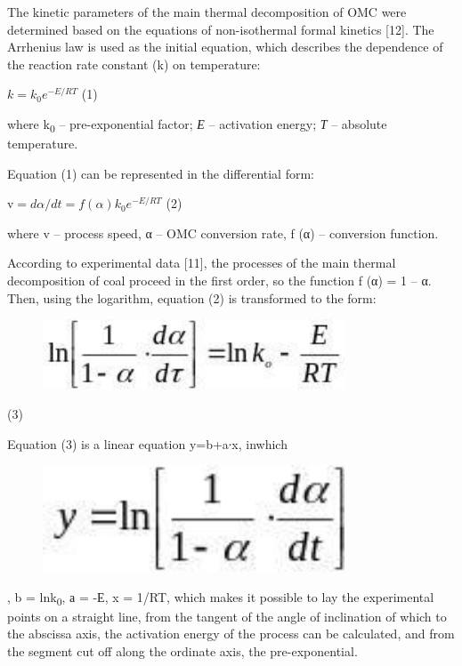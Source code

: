 The kinetic parameters of the main thermal decomposition of OMC were
determined based on the equations of non-isothermal formal kinetics
{[}12{]}. The Arrhenius law is used as the initial equation, which
describes the dependence of the reaction rate constant (k) on
temperature:

\(k = k_{0}e^{- E/RT}\) (1)

where k\textsubscript{0} -- pre-exponential factor; \emph{Е} --
activation energy; \emph{Т} -- absolute temperature.

Equation (1) can be represented in the differential form:

v\(= d\alpha/dt = f(\alpha)k_{0}e^{- E/RT}\) (2)

where v -- process speed, α -- OMC conversion rate, f (α) -- conversion
function.

According to experimental data {[}11{]}, the processes of the main
thermal decomposition of coal proceed in the first order, so the
function f (α) = 1 -- α. Then, using the logarithm, equation (2) is
transformed to the form:

\begin{figure}[H]
	\centering
	\includegraphics[width=0.8\textwidth]{assets/1058}
	\caption*{}
\end{figure} (3)

Equation (3) is a linear equation y=b+a∙x,
inwhich\begin{figure}[H]
	\centering
	\includegraphics[width=0.8\textwidth]{assets/1059}
	\caption*{}
\end{figure}, b = lnk\textsubscript{0}, а
= -Е, x = 1/RT, which makes it possible to lay the experimental points
on a straight line, from the tangent of the angle of inclination of
which to the abscissa axis, the activation energy of the process can be
calculated, and from the segment cut off along the ordinate axis, the
pre-exponential.

